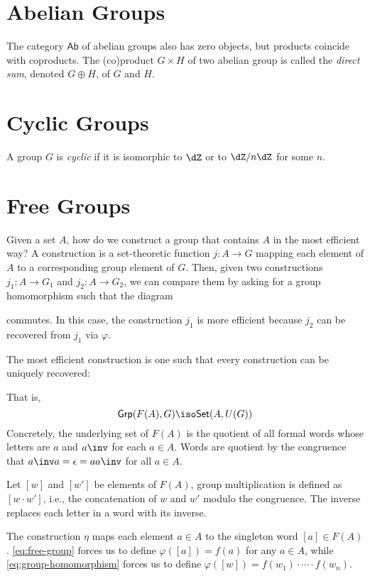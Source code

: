 \documentclass{amsart}
\begin{document}
\section{Abelian Groups}
\label{sec:abelian-groups}

The category $\mathsf{Ab}$ of abelian groups also has zero objects, but products coincide with coproducts.
The (co)product $G \times H$ of two abelian group is called the \emph{direct sum}, denoted $G \oplus H$, of $G$ and $H$.

\section{Cyclic Groups}
\label{sec:cyclic-groups}

\begin{defn}
  A group $G$ is \emph{cyclic} if it is isomorphic to $\dZ$ or to $\dZ/n\dZ$ for some $n$.
\end{defn}

\section{Free Groups}
\label{sec:free-groups}

Given a set $A$, how do we construct a group that contains $A$ in the most efficient way?
A construction is a set-theoretic function $j : A \to G$ mapping each element of $A$ to a corresponding group element of $G$.
Then, given two constructions $j_{1} : A \to G_{1}$ and $j_{2} : A \to G_{2}$, we can compare them by asking for a group homomorphism such that the diagram

commutes.
In this case, the construction $j_{1}$ is more efficient because $j_{2}$ can be recovered from $j_{1}$ via $\varphi$.

The most efficient construction is one such that every construction can be uniquely recovered:
\begin{equation}
  \label{eq:free-group}
  
\end{equation}

That is,
\[
  \mathsf{Grp}(F(A),G) \iso \mathsf{Set}(A,U(G))
\]
Concretely, the underlying set of $F(A)$ is the quotient of all formal words whose letters are $a$ and $a\inv$ for each $a \in A$.
Words are quotient by the congruence that $a\inv a = \epsilon = a a\inv$ for all $a \in A$.

Let $[w]$ and $[w']$ be elements of $F(A)$, group multiplication is defined as $[w \cdot w']$, i.e., the concatenation of $w$ and $w'$ modulo the congruence.
The inverse replaces each letter in a word with its inverse.

The construction $\eta$ maps each element $a \in A$ to the singleton word $[a] \in F(A)$.
\eqref{eq:free-group} forces us to define $\varphi([a]) = f(a)$ for any $a \in A$, while \eqref{eq:group-homomorphism} forces us to define $\varphi([w]) = f(w_{1}) \cdot \cdots \cdot f(w_{n})$.
\end{document}
